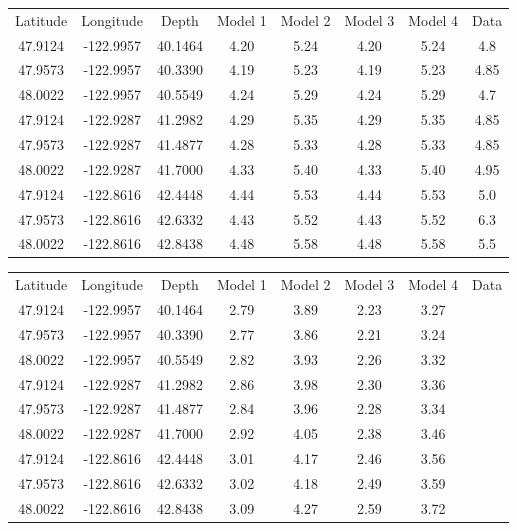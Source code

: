 \documentclass[workdone.tex]{subfiles}
\begin{document}
\begin{center}
\begin{tabular}{| c | c | c | c | c | c | c | c |}
  \hline
  Latitude & Longitude & Depth & Model 1 & Model 2 & Model 3 & Model 4 & Data \\
  47.9124 & -122.9957 & 40.1464 & 4.20 & 5.24 & 4.20 & 5.24 & 4.8 \\
  47.9573 & -122.9957 & 40.3390 & 4.19 & 5.23 & 4.19 & 5.23 & 4.85 \\
  48.0022 & -122.9957 & 40.5549 & 4.24 & 5.29 & 4.24 & 5.29 & 4.7 \\
  47.9124 & -122.9287 & 41.2982 & 4.29 & 5.35 & 4.29 & 5.35 & 4.85 \\
  47.9573 & -122.9287 & 41.4877 & 4.28 & 5.33 & 4.28 & 5.33 & 4.85 \\
  48.0022 & -122.9287 & 41.7000 & 4.33 & 5.40 & 4.33 & 5.40 & 4.95 \\
  47.9124 & -122.8616 & 42.4448 & 4.44 & 5.53 & 4.44 & 5.53 & 5.0 \\
  47.9573 & -122.8616 & 42.6332 & 4.43 & 5.52 & 4.43 & 5.52 & 6.3 \\
  48.0022 & -122.8616 & 42.8438 & 4.48 & 5.58 & 4.48 & 5.58 & 5.5 \\
  \hline
\end{tabular}
\captionsetup{type=table}
\end{center}

\begin{center}
\begin{tabular}{| c | c | c | c | c | c | c | c |}
  \hline
  Latitude & Longitude & Depth & Model 1 & Model 2 & Model 3 & Model 4 & Data \\
  47.9124 & -122.9957 & 40.1464 & 2.79 & 3.89 & 2.23 & 3.27 & \\
  47.9573 & -122.9957 & 40.3390 & 2.77 & 3.86 & 2.21 & 3.24 & \\
  48.0022 & -122.9957 & 40.5549 & 2.82 & 3.93 & 2.26 & 3.32 & \\
  47.9124 & -122.9287 & 41.2982 & 2.86 & 3.98 & 2.30 & 3.36 & \\
  47.9573 & -122.9287 & 41.4877 & 2.84 & 3.96 & 2.28 & 3.34 & \\
  48.0022 & -122.9287 & 41.7000 & 2.92 & 4.05 & 2.38 & 3.46 & \\
  47.9124 & -122.8616 & 42.4448 & 3.01 & 4.17 & 2.46 & 3.56 & \\
  47.9573 & -122.8616 & 42.6332 & 3.02 & 4.18 & 2.49 & 3.59 & \\
  48.0022 & -122.8616 & 42.8438 & 3.09 & 4.27 & 2.59 & 3.72 & \\
  \hline
\end{tabular}
\captionsetup{type=table}
\end{center}
\end{document}
